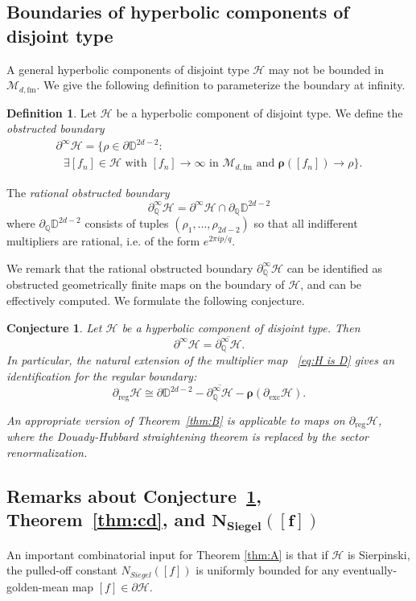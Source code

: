 \documentclass[11pt, reqno]{amsart}
\numberwithin{equation}{section}
\theoremstyle{plain}
\theoremstyle{theorem}
\newtheorem{conj}[theorem]{Conjecture}
\theoremstyle{plain}
\theoremstyle{definition}
\newtheorem{defn}[theorem]{Definition}
\newcommand{\Q}{\mathbb{Q}}
\newcommand{\D}{\mathbb{D}}
\newcommand{\fm}{\text{fm}}
\numberwithin{figure}{section}
\begin{document}
\subsection{Boundaries of hyperbolic components of disjoint type}\label{subsec:boundaryHyerbolicDisjointType}
A general hyperbolic components of disjoint type $\mathcal{H}$ may not be bounded in $\mathcal{M}_{d,\fm}$.
We give the following definition to parameterize the boundary at infinity.
\begin{defn}
    Let $\mathcal{H}$ be a hyperbolic component of disjoint type.
    We define the {\em obstructed boundary} 
\begin{multline*}
 \partial^\infty \mathcal{H} =\{\rho \in \partial \D^{2d-2} :\\
 \text{ $\exists [f_n] \in \mathcal{H}$ with }\text{$[f_n] \to \infty$ in $\mathcal{M}_{d, \fm}$ and $\boldsymbol{\rho}([f_n]) \to \rho$} \}.
\end{multline*}


    The {\em rational obstructed boundary} 
    $$
    \partial^\infty_\Q \mathcal{H} = \partial^\infty \mathcal{H} \cap \partial_\Q \D^{2d-2}
    $$ 
    where $\partial_\Q\D^{2d-2}$ consists of tuples $(\rho_1,..., \rho_{2d-2})$ so that all indifferent multipliers are rational, i.e. of the form $e^{2\pi i p/q}$.
\end{defn}
We remark that the rational obstructed boundary $\partial^\infty_\Q \mathcal{H}$ can be identified as obstructed geometrically finite maps on the boundary of $\mathcal{H}$, and can be effectively computed.
We formulate the following conjecture.
\begin{conj}\label{conj:gdt}
Let $\mathcal{H}$ be a hyperbolic component of disjoint type.
Then
    $$
    \partial^\infty \mathcal{H} = \overline{\partial^\infty_\Q \mathcal{H}}.
    $$
In particular, the natural extension of the multiplier map ~\eqref{eq:H is D} gives an identification for the regular boundary:
$$
\partial_{\operatorname{reg}}\mathcal{H} \cong \partial \D^{2d-2} - \overline{\partial^\infty_\Q \mathcal{H}} - \boldsymbol{\rho}(\partial_{\operatorname{exc}}\mathcal{H}).
$$

An appropriate version of Theorem~\ref{thm:B} is applicable to maps on $\partial_{\operatorname{reg}}\mathcal{H}$, where the Douady-Hubbard straightening theorem is replaced by the sector renormalization.
\end{conj}


\subsection*{Remarks about Conjecture~\ref{conj:gdt}, Theorem~\ref{thm:cd}, and  $\boldsymbol{N_{Siegel}([f])}$} An important combinatorial input for Theorem \ref{thm:A} is that if $\mathcal{H}$ is Sierpinski, the pulled-off constant $N_{Siegel}([f])$ is uniformly bounded for any eventually-golden-mean map $[f] \in \partial \mathcal{H}$. 
\end{document}
